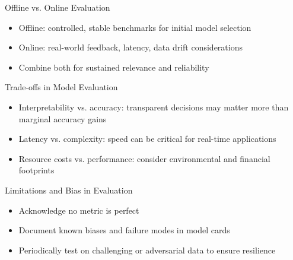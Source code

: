 \documentclass[aspectratio=169]{beamer}
\begin{document}

\begin{frame}{Offline vs. Online Evaluation}
\begin{itemize}
\item Offline: controlled, stable benchmarks for initial model selection
\item Online: real-world feedback, latency, data drift considerations
\item Combine both for sustained relevance and reliability
\end{itemize}
\end{frame}


\begin{frame}{Trade-offs in Model Evaluation}
\begin{itemize}
\item Interpretability vs. accuracy: transparent decisions may matter more than marginal accuracy gains
\item Latency vs. complexity: speed can be critical for real-time applications
\item Resource costs vs. performance: consider environmental and financial footprints
\end{itemize}
\end{frame}


\begin{frame}{Limitations and Bias in Evaluation}
\begin{itemize}
\item Acknowledge no metric is perfect
\item Document known biases and failure modes in model cards
\item Periodically test on challenging or adversarial data to ensure resilience
\end{itemize}
\end{frame}
\end{document}
